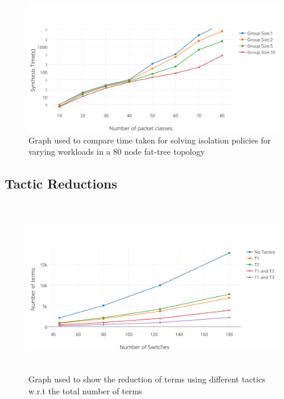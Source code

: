 \begin{figure}
	\includegraphics[width=\columnwidth]{figures/performance-isolation-groups-log-scale.png}
	\caption{Graph used to compare time taken for solving isolation policies for varying workloads in a 80 node fat-tree topology}
	\label{fig:isolation}
\end{figure}

\subsection{Tactic Reductions}
\begin{figure}
	\includegraphics[height=7.5cm]{figures/tactic-reduction.png}
	\caption{Graph used to show the reduction of terms using different tactics w.r.t the total number of terms}
	\label{fig:tactic-reduction}
\end{figure}

